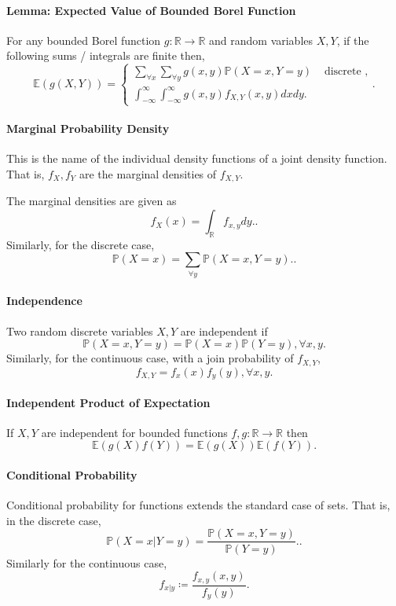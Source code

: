 \paragraph{Lemma: Expected Value of Bounded Borel Function}
For any bounded Borel function \(g: \mathbb{R} \to \mathbb{R}\)
and random variables \(X, Y\), if the following sums / integrals
are finite then,  \[
    \mathbb{E}(g(X, Y))
    = \begin{cases}
        \sum_{\forall x} \sum_{\forall y} g(x, y) \mathbb{P}(X = x, Y = y)
        & \text{ discrete }, \\
        \int_{-\infty}^{\infty} \int_{-\infty}^{\infty} 
        g(x, y) f_{X, Y}(x, y) dx dy.
    \end{cases}
.\]

\paragraph{Marginal Probability Density}
This is the name of the individual density functions of a joint
density function.
That is, \(f_X, f_Y\) are the marginal densities of \(f_{X, Y}\).

The marginal densities are given as  \[
    f_X(x) = \int_\mathbb{R} f_{x,y} dy.
.\] Similarly, for the discrete case, \[
    \mathbb{P}(X = x) = \sum_{\forall y} \mathbb{P}(X = x, Y = y).
.\]

\paragraph{Independence}
Two random discrete variables \(X, Y\) are independent if  \[
    \mathbb{P}(X = x, Y = y) = \mathbb{P}(X = x)\mathbb{P}(Y = y),
    \forall x, y
.\]
Similarly, for the continuous case, with a join probability of \(f_{X, Y}\),
 \[
    f_{X, Y} = f_x(x) f_y(y), \forall x, y
.\]

\paragraph{Independent Product of Expectation}
If \(X, Y\) are independent for bounded functions
\(f, g: \mathbb{R} \to \mathbb{R}\) then \[
    \mathbb{E}(g(X)f(Y)) = \mathbb{E}(g(X)) \mathbb{E}(f(Y))
.\]

\paragraph{Conditional Probability}
Conditional probability for functions extends the standard case of sets.
That is, in the discrete case, \[
    \mathbb{P}(X = x | Y = y) =
    \frac{\mathbb{P}(X = x, Y = y)}{\mathbb{P}(Y = y)}.
.\] Similarly for the continuous case, \[
    f_{x | y} \coloneqq
    \frac{f_{x, y}(x, y)}{f_y(y)}
.\]

